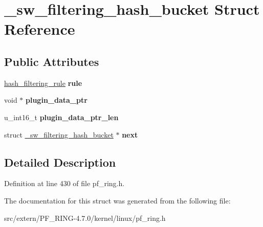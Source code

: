\hypertarget{struct__sw__filtering__hash__bucket}{
\section{\_\-sw\_\-filtering\_\-hash\_\-bucket Struct Reference}
\label{struct__sw__filtering__hash__bucket}
}
\subsection*{Public Attributes}
\begin{DoxyCompactItemize}
\item 
\hypertarget{struct__sw__filtering__hash__bucket_a943a1f19a487165c5561097a261bce53}{
\hyperlink{structhash__filtering__rule}{hash\_\-filtering\_\-rule} {\bfseries rule}}
\label{struct__sw__filtering__hash__bucket_a943a1f19a487165c5561097a261bce53}

\item 
\hypertarget{struct__sw__filtering__hash__bucket_a019858f07481994666d1cb8e77679b1c}{
void $\ast$ {\bfseries plugin\_\-data\_\-ptr}}
\label{struct__sw__filtering__hash__bucket_a019858f07481994666d1cb8e77679b1c}

\item 
\hypertarget{struct__sw__filtering__hash__bucket_a6fbbdf3951b09e36bfd99dd0d421610c}{
u\_\-int16\_\-t {\bfseries plugin\_\-data\_\-ptr\_\-len}}
\label{struct__sw__filtering__hash__bucket_a6fbbdf3951b09e36bfd99dd0d421610c}

\item 
\hypertarget{struct__sw__filtering__hash__bucket_abc9a129c55eea44dd430ac49206dd167}{
struct \hyperlink{struct__sw__filtering__hash__bucket}{\_\-sw\_\-filtering\_\-hash\_\-bucket} $\ast$ {\bfseries next}}
\label{struct__sw__filtering__hash__bucket_abc9a129c55eea44dd430ac49206dd167}

\end{DoxyCompactItemize}


\subsection{Detailed Description}


Definition at line 430 of file pf\_\-ring.h.



The documentation for this struct was generated from the following file:\begin{DoxyCompactItemize}
\item 
src/extern/PF\_\-RING-\/4.7.0/kernel/linux/pf\_\-ring.h\end{DoxyCompactItemize}
